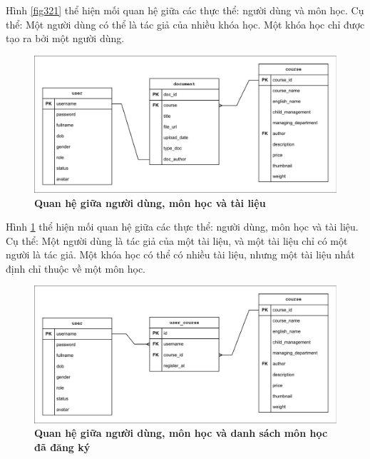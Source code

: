 \documentclass{article}
\begin{document}
	 Hình \ref{fig321} thể hiện mối quan hệ giữa các thực thể: người dùng và môn học. Cụ thể: Một người dùng có thể là tác giả của nhiều khóa học. Một khóa học chỉ được tạo ra bởi một người dùng.
	 
	 \begin{figure}[!ht]
	 	\centering
	 	\includegraphics[trim= 10pt 10pt 10pt 10pt, clip, width=15.5cm]{edr_fig322_1.pdf}
	 	\caption [Quan hệ giữa người dùng, môn học và tài liệu]{\bfseries \fontsize{12pt}{0pt}\selectfont Quan hệ giữa người dùng, môn học và tài liệu}
	 	\label{fig322}
	 \end{figure}
	 
	 Hình \ref{fig322} thể hiện mối quan hệ giữa các thực thể: người dùng, môn học và tài liệu. Cụ thể: Một người dùng là tác giả của một tài liệu, và một tài liệu chỉ có một người là tác giả. Một khóa học có thể có nhiều tài liệu, nhưng một tài liệu nhất định chỉ thuộc về một môn học.
	 
	 \begin{figure}[!ht]
	 	\centering
	 	\includegraphics[trim= 10pt 10pt 10pt 10pt, clip, width=15.5cm]{edr_fig323.pdf}
	 	\caption [Quan hệ giữa người dùng, môn học và danh sách môn học đã đăng ký]{\bfseries \fontsize{12pt}{0pt}\selectfont Quan hệ giữa người dùng, môn học và danh sách môn học đã đăng ký}
	 	\label{fig323}
	 \end{figure}
	 
\end{document}
